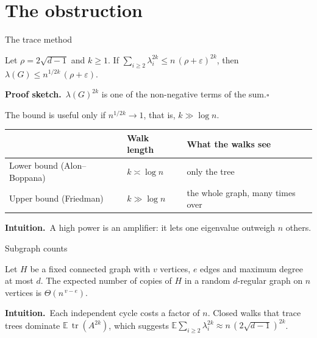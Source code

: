 \documentclass[aspectratio=169,10pt]{beamer}
\DeclareMathOperator{\tr}{tr}
\newcommand{\edge}{2\sqrt{d-1}}
\newcommand{\eps}{\varepsilon}
\newcommand{\E}{\mathbb{E}}
\newcommand{\intuition}{{\color{accent}\textbf{Intuition.}}\ }
\newcommand{\pf}{\textbf{Proof sketch.}\ }
\begin{document}
\section{The obstruction}

\begin{frame}{The trace method}
  \begin{lemma}
    Let $\rho=\edge$ and $k\ge1$. If\/ $\sum_{i\ge2}\lambda_i^{2k}\le n\,(\rho+\eps)^{2k}$, then\/
    $\lambda(G)\le n^{1/2k}\,(\rho+\eps)$.
  \end{lemma}
  \pf $\lambda(G)^{2k}$ is one of the non-negative terms of the sum.\hfill$\square$

  \vspace{1mm}
  The bound is useful only if $n^{1/2k}\to1$, that is, $k\gg\log n$.

  \vspace{1mm}
  \begin{center}\small
  \begin{tabular}{@{}lll@{}}
    \toprule
    & Walk length & What the walks see\\
    \midrule
    Lower bound (Alon--Boppana) & $k\asymp\log n$ & only the tree\\
    Upper bound (Friedman) & $k\gg\log n$ & the whole graph, many times over\\
    \bottomrule
  \end{tabular}
  \end{center}
  \intuition A high power is an amplifier: it lets one eigenvalue outweigh $n$ others.
\end{frame}

\begin{frame}{Subgraph counts}
  \begin{lemma}
    Let $H$ be a fixed connected graph with $v$ vertices, $e$ edges and maximum degree at most $d$.
    The expected number of copies of $H$ in a random $d$-regular graph on $n$ vertices is $\Theta(n^{\,v-e})$.
  \end{lemma}
  \vspace{-1mm}
  \begin{center}
    
  \end{center}
  \vspace{-2mm}
  \intuition Each independent cycle costs a factor of $n$. Closed walks that trace trees dominate
  $\E\,\tr(A^{2k})$, which suggests $\E\sum_{i\ge2}\lambda_i^{2k}\approx n\,(\edge)^{2k}$.
\end{frame}
\end{document}
